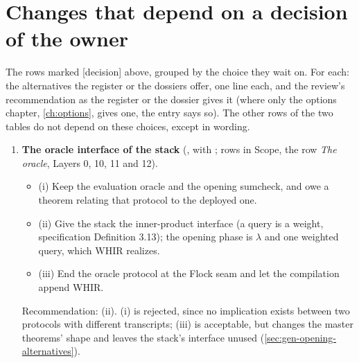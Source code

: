 \section{Changes that depend on a decision of the owner}\label{sec:chg-decisions}

\begin{sloppypar}
The rows marked \textsf{[decision]} above, grouped by the choice they wait on. For each: the
alternatives the register or the dossiers offer, one line each, and the review's recommendation as
the register or the dossier gives it (where only the options chapter, \cref{ch:options}, gives one,
the entry says so). The other rows of the two tables do not depend on these choices, except in
wording.
\end{sloppypar}

\begin{enumerate}[leftmargin=*, itemsep=6pt]
\item \textbf{The oracle interface of the stack} (, with ; rows in Scope, the
  row \emph{The oracle}, Layers 0, 10, 11 and 12).
  \begin{itemize}[label={}, leftmargin=1.2em]
  \item (i) Keep the evaluation oracle and the opening sumcheck, and owe a theorem relating that
    protocol to the deployed one.
  \item (ii) Give the stack the inner-product interface (a query is a weight, specification
    Definition 3.13); the opening phase is $λ$ and one weighted query, which WHIR realizes.
  \item (iii) End the oracle protocol at the Flock seam and let the compilation append WHIR.
  \end{itemize}
  Recommendation: (ii). (i) is rejected, since no implication exists between two protocols with
  different transcripts; (iii) is acceptable, but changes the master theorems' shape and leaves the
  stack's interface unused (\cref{sec:gen-opening-alternatives}).


\end{enumerate}
